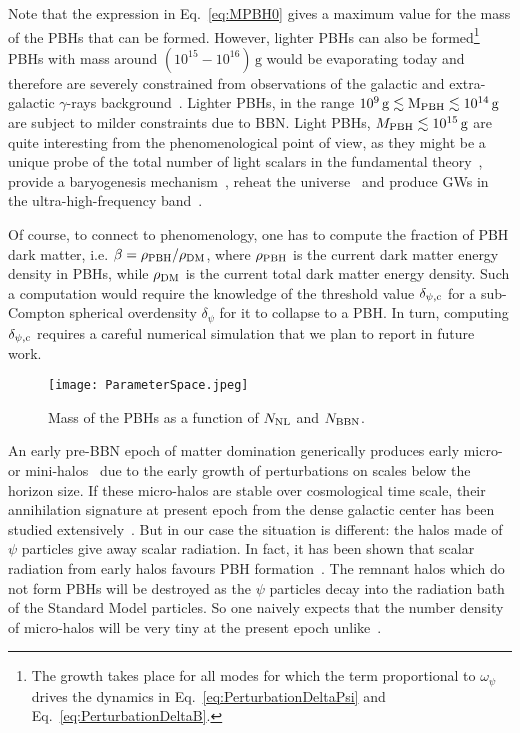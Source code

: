 \documentclass[a4paper, amsfonts, amssymb, amsmath, reprint, showkeys, nofootinbib, twoside, superscriptaddress]{revtex4-1}
\begin{document}
Note that the expression in Eq.~\eqref{eq:MPBH0} gives a maximum value for the mass of the PBHs that can be formed. However, lighter PBHs can also be formed\footnote{The growth takes place for all modes for which  the term proportional to $\omega_{\psi}$ drives the dynamics in Eq.~\eqref{eq:PerturbationDeltaPsi} and Eq.~\eqref{eq:PerturbationDeltaB}.} PBHs with mass around $(10^{15}-10^{16}) \, \text{g}$ would be evaporating today and therefore are severely constrained from observations of the galactic and extra-galactic $\gamma$-rays background~\cite{Carr:2020gox}. Lighter PBHs, in the range $10^9 \, \rm{g} \lesssim M_{\rm PBH} \lesssim 10^{14} \, \rm{g}$ are subject to milder constraints due to BBN. Light PBHs, $M_{\rm PBH} \lesssim 10^{15} \, \rm{g}$ are quite interesting from the phenomenological point of view, as they might be a unique probe of the total number of light scalars in the fundamental theory~\cite{Calza:2021czr}, provide a baryogenesis mechanism~\cite{Hooper:2020otu}, reheat the universe~\cite{Lennon:2017tqq, Baldes:2020nuv} and produce GWs in the ultra-high-frequency band~\cite{Anantua:2008am, Dolgov:2011cq, Zagorac:2019ekv}.

Of course, to connect to phenomenology, one has to compute the fraction of PBH dark matter, i.e. $\beta = \rho_{\rm PBH}/\rho_{\rm DM}$, where $\rho_{\rm PBH}$ is the current dark matter energy density in PBHs, while $\rho_{\rm DM}$ is the current total dark matter energy density. Such a computation would require the knowledge of the threshold value $\delta_{\psi, \rm{c}}$ for a sub-Compton spherical overdensity $\delta_\psi$  for it to collapse to a PBH. In turn, computing $\delta_{\psi, \rm{c}}$ requires a careful numerical simulation that we plan to report in future work.

\begin{figure}[h!]
  \texttt{[image: ParameterSpace.jpeg]}
\caption{Mass of the PBHs as a function of $N_{\rm NL}$ and $N_{\rm BBN}$.}
\label{fig:ParameterSpace}
\end{figure}

An early pre-BBN epoch of matter domination generically produces early micro- or mini-halos~\cite{ Blinov:2021axd, Barenboim:2021swl} due to the early growth of perturbations on scales below the horizon size. If these micro-halos are stable over cosmological time scale, their annihilation signature at present epoch from the dense galactic center has been studied extensively~\cite{Blanco:2019eij}. But in our case the situation is different: the halos made of $\psi$ particles give away scalar radiation. In fact, it has been shown that scalar radiation from early halos favours PBH formation~\cite{Flores:2020drq}. The remnant halos which do not form PBHs will be destroyed as the $\psi$ particles decay into the radiation bath of the Standard Model particles. So one naively expects that the number density of micro-halos will be very tiny at the present epoch unlike~\cite{Blinov:2021axd}.
\end{document}
